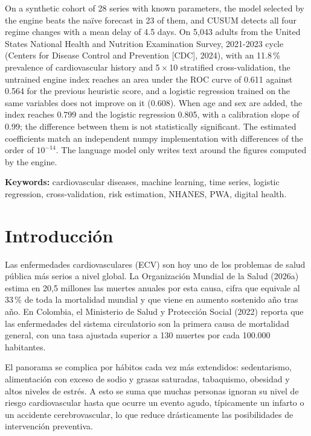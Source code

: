 \documentclass[12pt,letterpaper]{article}
\begin{document}
On a synthetic cohort of 28 series with known parameters, the model selected by
the engine beats the naïve forecast in 23 of them, and CUSUM detects all four
regime changes with a mean delay of 4.5 days. On 5,043 adults from the United
States National Health and Nutrition Examination Survey, 2021-2023 cycle
(Centers for Disease Control and Prevention [CDC], 2024), with an 11.8\,\%
prevalence of cardiovascular history and 5\,$\times$\,10 stratified
cross-validation, the untrained engine index reaches an area under the ROC curve
of 0.611 against 0.564 for the previous heuristic score, and a logistic
regression trained on the same variables does not improve on it (0.608). When age
and sex are added, the index reaches 0.799 and the logistic regression 0.805,
with a calibration slope of 0.99; the difference between them is not
statistically significant. The estimated coefficients match an independent numpy
implementation with differences of the order of $10^{-14}$. The language model only writes text around
the figures computed by the engine.

\vspace{0.4cm}
\noindent\textbf{Keywords:} cardiovascular diseases, machine learning, time
series, logistic regression, cross-validation, risk estimation, NHANES, PWA,
digital health.


\newpage

\section{Introducción}

Las enfermedades cardiovasculares (ECV) son hoy uno de los problemas de salud
pública más serios a nivel global. La Organización Mundial de la Salud (2026a)
estima en 20,5 millones las muertes anuales por esta causa, cifra que equivale al
33\,\% de toda la mortalidad mundial y que viene en aumento sostenido año tras
año. En Colombia, el Ministerio de Salud y Protección Social (2022) reporta que
las enfermedades del sistema circulatorio son la primera causa de mortalidad
general, con una tasa ajustada superior a 130 muertes por cada 100.000
habitantes.

El panorama se complica por hábitos cada vez más extendidos: sedentarismo,
alimentación con exceso de sodio y grasas saturadas, tabaquismo, obesidad y altos
niveles de estrés. A esto se suma que muchas personas ignoran su nivel de riesgo
cardiovascular hasta que ocurre un evento agudo, típicamente un infarto o un
accidente cerebrovascular, lo que reduce drásticamente las posibilidades de
intervención preventiva.
\end{document}
